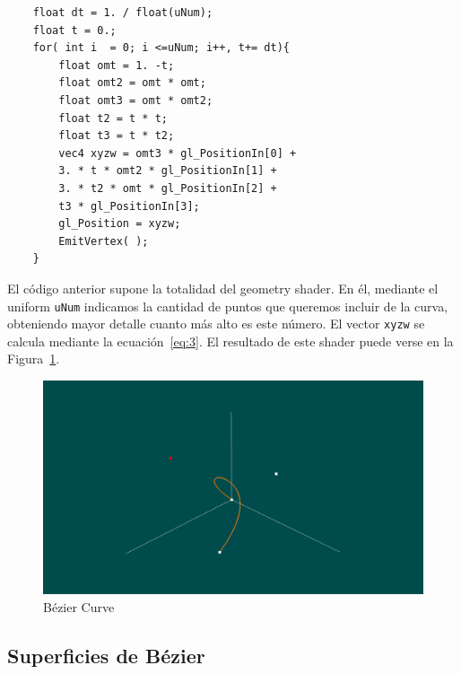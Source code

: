 \begin{verbatim}
    float dt = 1. / float(uNum);
    float t = 0.;
    for( int i  = 0; i <=uNum; i++, t+= dt){
        float omt = 1. -t;
        float omt2 = omt * omt;
        float omt3 = omt * omt2;
        float t2 = t * t;
        float t3 = t * t2;
        vec4 xyzw = omt3 * gl_PositionIn[0] +
        3. * t * omt2 * gl_PositionIn[1] +
        3. * t2 * omt * gl_PositionIn[2] +
        t3 * gl_PositionIn[3];
        gl_Position = xyzw;
        EmitVertex( );
    }
\end{verbatim}

El código anterior supone la totalidad del geometry shader. En él, mediante el
uniform \verb|uNum| indicamos la cantidad de puntos que queremos incluir de la
curva, obteniendo mayor detalle cuanto más alto es este número. El vector
\verb|xyzw| se calcula mediante la ecuación~\eqref{eq:3}. El resultado de este
shader puede verse en la Figura~\ref{fig:mybeziercurve}.

\begin{figure}
	\centering
	\includegraphics[width=\textwidth]{figures/mybeziercurve.png}
	\caption{Bézier Curve}
	\label{fig:mybeziercurve}
\end{figure}

\subsection{Superficies de Bézier}
\label{makereference5.5.3}

